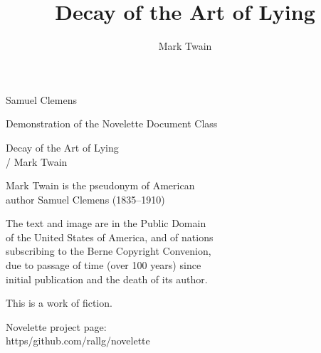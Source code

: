 \documentclass{novelette}
\title{Decay of the Art of Lying}
\author{Mark Twain}
\begin{document}
\frontmatter

\begin{display}
\vfil
\begin{center}
\par
{}\par
{}\par
\end{center}
\null\null\null\null
\vfil
\end{display}

\begin{display}
\vfil
{}
{\centering Samuel Clemens\par}
\vfil
\end{display}

\begin{display}
\null\null\null\null\null\null
\begin{center}
\par
{}\par
{}\par
\null\null
{}\par
\vfill
Demonstration of the Novelette Document Class\par
\end{center}
\end{display}

\begin{display}
\vfill
\begin{center}
Decay of the Art of Lying\\
/ Mark Twain\par
Mark Twain is the pseudonym of American\\
author Samuel Clemens (1835--1910)\par
The text and image are in the Public Domain\\
of the United States of America, and of nations\\
subscribing to the Berne Copyright Convenion,\\
due to passage of time (over 100 years) since\\
initial publication and the death of its author.\par
This is a work of fiction.\par
Novelette project page:\\
https/github.com/rallg/novelette\par
\end{center}
\null\null
\end{display}
\end{document}

